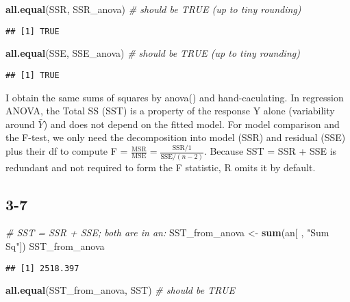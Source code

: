 \documentclass[
]{article}
\newenvironment{Shaded}{\begin{snugshade}}{\end{snugshade}}
\newcommand{\CommentTok}[1]{\textcolor[rgb]{0.56,0.35,0.01}{\textit{#1}}}
\newcommand{\FunctionTok}[1]{\textcolor[rgb]{0.13,0.29,0.53}{\textbf{#1}}}
\newcommand{\NormalTok}[1]{#1}
\newcommand{\OtherTok}[1]{\textcolor[rgb]{0.56,0.35,0.01}{#1}}
\newcommand{\StringTok}[1]{\textcolor[rgb]{0.31,0.60,0.02}{#1}}
\begin{document}
\begin{Shaded}
\begin{Highlighting}[]
\FunctionTok{all.equal}\NormalTok{(SSR, SSR\_anova)  }\CommentTok{\# should be TRUE (up to tiny rounding)}
\end{Highlighting}
\end{Shaded}

\begin{verbatim}
## [1] TRUE
\end{verbatim}

\begin{Shaded}
\begin{Highlighting}[]
\FunctionTok{all.equal}\NormalTok{(SSE, SSE\_anova)  }\CommentTok{\# should be TRUE (up to tiny rounding)}
\end{Highlighting}
\end{Shaded}

\begin{verbatim}
## [1] TRUE
\end{verbatim}

I obtain the same sums of squares by anova() and hand-caculating. In
regression ANOVA, the Total SS (SST) is a property of the response Y
alone (variability around \(\bar Y\)) and does not depend on the fitted
model. For model comparison and the F-test, we only need the
decomposition into model (SSR) and residual (SSE) plus their df to
compute F =
\(\frac{\text{MSR}}{\text{MSE}} = \frac{\text{SSR}/1}{\text{SSE}/(n-2)}\).
Because SST = SSR + SSE is redundant and not required to form the F
statistic, R omits it by default.

\subsection{3-7}\label{section-17}

\begin{Shaded}
\begin{Highlighting}[]
\CommentTok{\# SST = SSR + SSE; both are in \textasciigrave{}an\textasciigrave{}:}
\NormalTok{SST\_from\_anova }\OtherTok{\textless{}{-}} \FunctionTok{sum}\NormalTok{(an[ , }\StringTok{"Sum Sq"}\NormalTok{])}
\NormalTok{SST\_from\_anova}
\end{Highlighting}
\end{Shaded}

\begin{verbatim}
## [1] 2518.397
\end{verbatim}

\begin{Shaded}
\begin{Highlighting}[]
\FunctionTok{all.equal}\NormalTok{(SST\_from\_anova, SST)   }\CommentTok{\# should be TRUE}
\end{Highlighting}
\end{Shaded}
\end{document}
